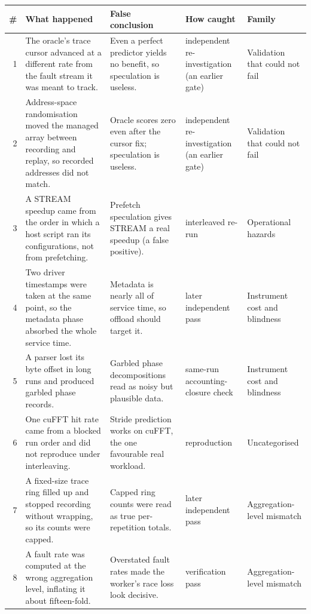 \documentclass[journal]{IEEEtran}
\begin{document}
{\footnotesize
\begin{longtable}{@{}r >{\raggedright\arraybackslash}p{} >{\raggedright\arraybackslash}p{} >{\raggedright\arraybackslash}p{} >{\raggedright\arraybackslash}p{}@{}}
\toprule
\# & What happened & False conclusion & How caught & Family \\
\midrule
\endhead
1 & The oracle's trace cursor advanced at a different rate from the fault stream it was meant to track. & Even a perfect predictor yields no benefit, so speculation is useless. & independent re-\allowbreak{}investigation (an earlier gate) & Validation that could not fail \\
2 & Address-\allowbreak{}space randomisation moved the managed array between recording and replay, so recorded addresses did not match. & Oracle scores zero even after the cursor fix; speculation is useless. & independent re-\allowbreak{}investigation (an earlier gate) & Validation that could not fail \\
3 & A STREAM speedup came from the order in which a host script ran its configurations, not from prefetching. & Prefetch speculation gives STREAM a real speedup (a false positive). & interleaved re-\allowbreak{}run & Operational hazards \\
4 & Two driver timestamps were taken at the same point, so the metadata phase absorbed the whole service time. & Metadata is nearly all of service time, so offload should target it. & later independent pass & Instrument cost and blindness \\
5 & A parser lost its byte offset in long runs and produced garbled phase records. & Garbled phase decompositions read as noisy but plausible data. & same-\allowbreak{}run accounting-\allowbreak{}closure check & Instrument cost and blindness \\
6 & One cuFFT hit rate came from a blocked run order and did not reproduce under interleaving. & Stride prediction works on cuFFT, the one favourable real workload. & reproduction & Uncategorised \\
7 & A fixed-\allowbreak{}size trace ring filled up and stopped recording without wrapping, so its counts were capped. & Capped ring counts were read as true per-\allowbreak{}repetition totals. & later independent pass & Aggregation-\allowbreak{}level mismatch \\
8 & A fault rate was computed at the wrong aggregation level, inflating it about fifteen-\allowbreak{}fold. & Overstated fault rates made the worker's race loss look decisive. & verification pass & Aggregation-\allowbreak{}level mismatch \\

\end{longtable}}
\end{document}

